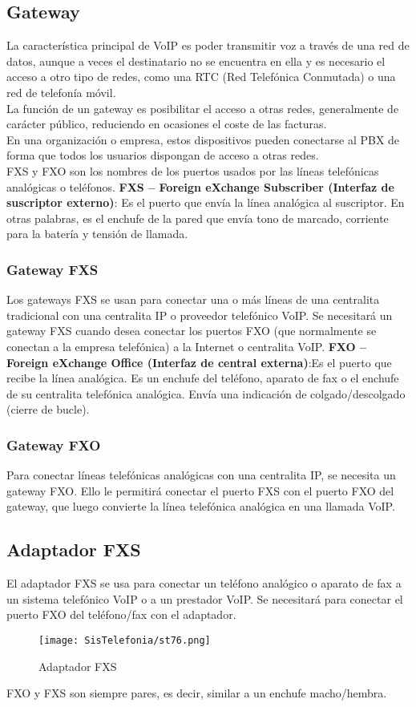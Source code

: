 \documentclass[
	11pt, %
	fleqn, %
	a4paper, %
]{LegrandOrangeBook}
\begin{document}
\subsection{Gateway}
La característica principal de VoIP es poder transmitir voz a través de una red de datos, aunque a veces el destinatario no se encuentra en ella y es necesario el acceso a otro tipo de redes, como una RTC (Red Telefónica Conmutada) o una red de telefonía móvil.\\
La función de un gateway es posibilitar el acceso a otras redes, generalmente de carácter público, reduciendo en ocasiones el coste de las facturas.\\
En una organización o empresa, estos dispositivos pueden conectarse al PBX de forma que todos los usuarios dispongan de acceso a otras redes.\\
FXS y FXO son los nombres de los puertos usados por las líneas telefónicas analógicas o teléfonos.
\textbf{FXS – Foreign eXchange Subscriber (Interfaz de suscriptor externo)}: Es el puerto que envía la línea analógica al suscriptor. En otras palabras, es el enchufe de la pared que envía tono de marcado, corriente para la batería y tensión de llamada.
\subsubsection{Gateway FXS}
Los gateways FXS se usan para conectar una o más líneas de una centralita tradicional con una centralita IP o proveedor telefónico VoIP. 
Se necesitará un gateway FXS cuando desea conectar los puertos FXO (que normalmente se conectan a la empresa telefónica) a la Internet o centralita VoIP.
\textbf{FXO – Foreign eXchange Office (Interfaz de central externa)}:Es el puerto que recibe la línea analógica. Es un enchufe del teléfono, aparato de fax o el enchufe de su centralita telefónica analógica. Envía una indicación de colgado/descolgado (cierre de bucle).
\subsubsection{Gateway FXO}
Para conectar líneas telefónicas analógicas con una centralita IP, se necesita un gateway FXO.
Ello le permitirá conectar el puerto FXS con el puerto FXO del gateway, que luego convierte la línea telefónica analógica en una llamada VoIP.
\subsection{Adaptador FXS}
El adaptador FXS se usa para conectar un teléfono analógico o aparato de fax a un sistema telefónico VoIP o a un prestador VoIP.
Se necesitará para conectar el puerto FXO del teléfono/fax con el adaptador.
\begin{figure}[H]
\centering
\texttt{[image: SisTelefonia/st76.png]}
\caption{Adaptador FXS}
\label{fig:adaptadorfsx}
\end{figure}
FXO y FXS son siempre pares, es decir, similar a un enchufe macho/hembra.
\end{document}
